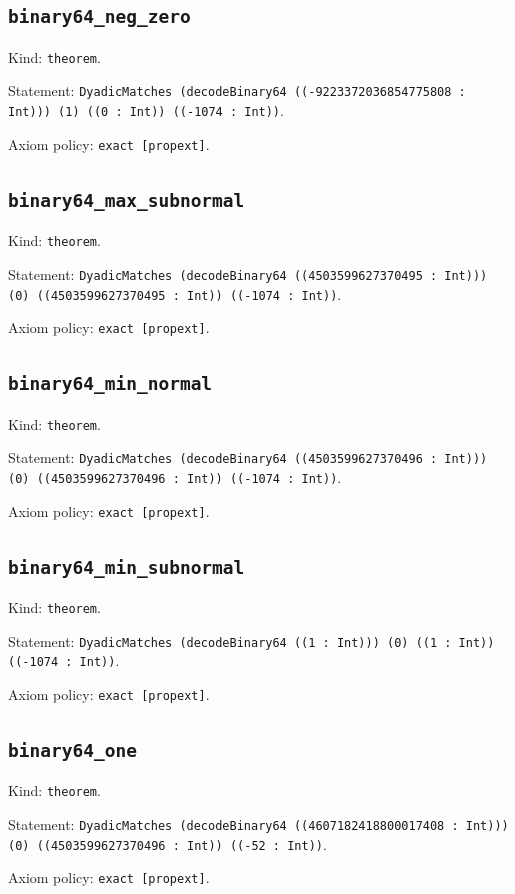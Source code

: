 \documentclass[11pt]{article}
\begin{document}
\subsection*{\texttt{binary64\_neg\_zero}}
\noindent Kind: \texttt{theorem}.\par
\noindent Statement: \texttt{DyadicMatches (decodeBinary64 ((-9223372036854775808 : Int))) (1) ((0 : Int)) ((-1074 : Int))}.\par
\noindent Axiom policy: \texttt{exact [propext]}.\par
\subsection*{\texttt{binary64\_max\_subnormal}}
\noindent Kind: \texttt{theorem}.\par
\noindent Statement: \texttt{DyadicMatches (decodeBinary64 ((4503599627370495 : Int))) (0) ((4503599627370495 : Int)) ((-1074 : Int))}.\par
\noindent Axiom policy: \texttt{exact [propext]}.\par
\subsection*{\texttt{binary64\_min\_normal}}
\noindent Kind: \texttt{theorem}.\par
\noindent Statement: \texttt{DyadicMatches (decodeBinary64 ((4503599627370496 : Int))) (0) ((4503599627370496 : Int)) ((-1074 : Int))}.\par
\noindent Axiom policy: \texttt{exact [propext]}.\par
\subsection*{\texttt{binary64\_min\_subnormal}}
\noindent Kind: \texttt{theorem}.\par
\noindent Statement: \texttt{DyadicMatches (decodeBinary64 ((1 : Int))) (0) ((1 : Int)) ((-1074 : Int))}.\par
\noindent Axiom policy: \texttt{exact [propext]}.\par
\subsection*{\texttt{binary64\_one}}
\noindent Kind: \texttt{theorem}.\par
\noindent Statement: \texttt{DyadicMatches (decodeBinary64 ((4607182418800017408 : Int))) (0) ((4503599627370496 : Int)) ((-52 : Int))}.\par
\noindent Axiom policy: \texttt{exact [propext]}.\par
\end{document}
